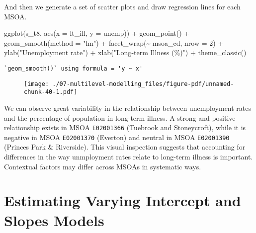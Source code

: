 \documentclass[
  letterpaper,
  krantz2]{style/krantz}
\newenvironment{Shaded}{\begin{snugshade}}{\end{snugshade}}
\newcommand{\AttributeTok}[1]{\textcolor[rgb]{0.40,0.45,0.13}{#1}}
\newcommand{\DecValTok}[1]{\textcolor[rgb]{0.68,0.00,0.00}{#1}}
\newcommand{\FunctionTok}[1]{\textcolor[rgb]{0.28,0.35,0.67}{#1}}
\newcommand{\NormalTok}[1]{\textcolor[rgb]{0.00,0.23,0.31}{#1}}
\newcommand{\SpecialCharTok}[1]{\textcolor[rgb]{0.37,0.37,0.37}{#1}}
\newcommand{\StringTok}[1]{\textcolor[rgb]{0.13,0.47,0.30}{#1}}
\begin{document}
And then we generate a set of scatter plots and draw regression lines
for each MSOA.

\begin{Shaded}
\begin{Highlighting}[]
\FunctionTok{ggplot}\NormalTok{(s\_t8, }\FunctionTok{aes}\NormalTok{(}\AttributeTok{x =}\NormalTok{ lt\_ill, }\AttributeTok{y =}\NormalTok{ unemp)) }\SpecialCharTok{+} 
  \FunctionTok{geom\_point}\NormalTok{() }\SpecialCharTok{+} 
  \FunctionTok{geom\_smooth}\NormalTok{(}\AttributeTok{method =} \StringTok{"lm"}\NormalTok{) }\SpecialCharTok{+}
  \FunctionTok{facet\_wrap}\NormalTok{(}\SpecialCharTok{\textasciitilde{}}\NormalTok{ msoa\_cd, }\AttributeTok{nrow =} \DecValTok{2}\NormalTok{) }\SpecialCharTok{+}
  \FunctionTok{ylab}\NormalTok{(}\StringTok{"Unemployment rate"}\NormalTok{) }\SpecialCharTok{+} 
  \FunctionTok{xlab}\NormalTok{(}\StringTok{"Long{-}term Illness (\%)"}\NormalTok{) }\SpecialCharTok{+}
  \FunctionTok{theme\_classic}\NormalTok{()}
\end{Highlighting}
\end{Shaded}

\begin{verbatim}
`geom_smooth()` using formula = 'y ~ x'
\end{verbatim}

\begin{figure}[H]

{\centering \texttt{[image: ./07-multilevel-modelling\_files/figure-pdf/unnamed-chunk-40-1.pdf]}

}

\end{figure}

We can observe great variability in the relationship between
unemployment rates and the percentage of population in long-term
illness. A strong and positive relationship exists in MSOA
\texttt{E02001366} (Tuebrook and Stoneycroft), while it is negative in
MSOA \texttt{E02001370} (Everton) and neutral in MSOA \texttt{E02001390}
(Princes Park \& Riverside). This visual inspection suggests that
accounting for differences in the way unmployment rates relate to
long-term illness is important. Contextual factors may differ across
MSOAs in systematic ways.

\hypertarget{estimating-varying-intercept-and-slopes-models}{%
\section{Estimating Varying Intercept and Slopes
Models}\label{estimating-varying-intercept-and-slopes-models}}
\end{document}
